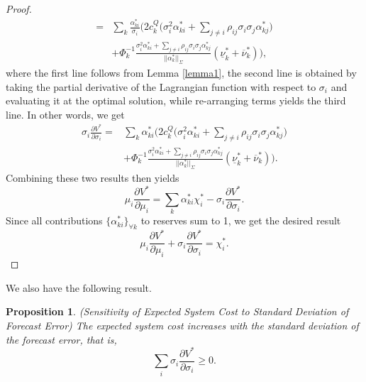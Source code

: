 \documentclass{article}
\newtheorem{proposition}{Proposition}
\begin{document}
\begin{proof}
\begin{align*}
=&\sum_k\frac{\alpha_{ki}^*}{\sigma_i}\Big(2c_k^Q\big(\sigma_i^2 \alpha_{ki}^* + \sum_{j \ne i} \rho_{ij} \sigma_i \sigma_j\alpha_{kj}^*\big)\\
&+ \Phi_k^{-1} \frac{\sigma_i^2 \alpha_{ki}^* + \sum_{j \ne i} \rho_{ij} \sigma_i \sigma_j \alpha_{kj}^*}{||\alpha_k^*||_{\Sigma}}(\underline{\nu}_k^* + \overline{\nu}_k^*)\Big),
\end{align*}
where the first line follows from Lemma \ref{lemma1}, the second line is obtained by taking the partial derivative of the Lagrangian function with respect to $\sigma_i$ and evaluating it at the optimal solution, while re-arranging terms yields the third line. In other words, we get
\begin{align*}
\sigma_i \frac{\partial V^*}{\partial \sigma_i} =& \sum_k \alpha_{ki}^*\Big(2c_k^Q\big(\sigma_i^2 \alpha_{ki}^* + \sum_{j \ne i} \rho_{ij} \sigma_i \sigma_j\alpha_{kj}^*\big)\\
&+ \Phi_k^{-1} \frac{\sigma_i^2 \alpha_{ki}^* + \sum_{j \ne i} \rho_{ij} \sigma_i \sigma_j \alpha_{kj}^*}{||\alpha_k^*||_{\Sigma}}(\underline{\nu}_k^* + \overline{\nu}_k^*)\Big).
\end{align*}
Combining these two results then yields
\begin{equation*}
\mu_i \frac{\partial V^*}{\partial \mu_i} = \sum_k\alpha_{ki}^* \chi_i^* - \sigma_i \frac{\partial V^*}{\partial \sigma_i}.
\end{equation*}
Since all contributions $\{\alpha_{ki}^*\}_{\forall k}$ to reserves sum to 1, we get the desired result
\begin{equation*}
\mu_i \frac{\partial V^*}{\partial \mu_i} + \sigma_i \frac{\partial V^*}{\partial \sigma_i} = \chi_i^*.
\end{equation*}
\end{proof}
We also have the following result.
\begin{proposition}
(Sensitivity of Expected System Cost to Standard Deviation of Forecast Error) The expected system cost increases with the standard deviation of the forecast error, that is, 
\begin{equation*}
\sum_i \sigma_i \frac{\partial V^*}{\partial \sigma_i} \ge 0.
\end{equation*}
\end{proposition}
\end{document}

